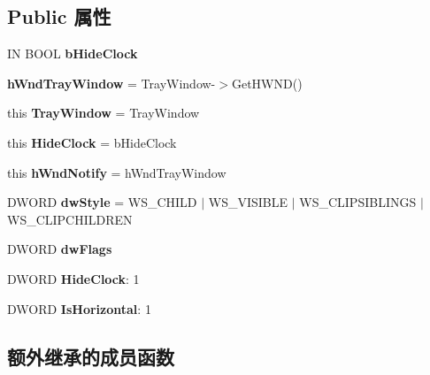 \subsection*{Public 属性}
\begin{DoxyCompactItemize}
\item 
IN B\+O\+OL {\bfseries b\+Hide\+Clock}
\item 
\mbox{\label{class_c_tray_notify_wnd_ac8056d1c145e8b71c3adc0f40e48aa59}} 
{\bfseries h\+Wnd\+Tray\+Window} = Tray\+Window-\/$>$Get\+H\+W\+ND()
\item 
\mbox{\label{class_c_tray_notify_wnd_ae325c9de4563bf180365768639f06223}} 
this {\bfseries Tray\+Window} = Tray\+Window
\item 
\mbox{\label{class_c_tray_notify_wnd_a49c2877dcc4a490e6e7c34b9729a928d}} 
this {\bfseries Hide\+Clock} = b\+Hide\+Clock
\item 
\mbox{\label{class_c_tray_notify_wnd_a754a0c23249526b825e614d6de08f176}} 
this {\bfseries h\+Wnd\+Notify} = h\+Wnd\+Tray\+Window
\item 
\mbox{\label{class_c_tray_notify_wnd_a4e863bb3d61522fdf5c8e6b472290bd9}} 
D\+W\+O\+RD {\bfseries dw\+Style} = W\+S\+\_\+\+C\+H\+I\+LD $\vert$ W\+S\+\_\+\+V\+I\+S\+I\+B\+LE $\vert$ W\+S\+\_\+\+C\+L\+I\+P\+S\+I\+B\+L\+I\+N\+GS $\vert$ W\+S\+\_\+\+C\+L\+I\+P\+C\+H\+I\+L\+D\+R\+EN
\item 
\mbox{\label{class_c_tray_notify_wnd_aebcd33d4eec9694f3432b4d08e06137e}} 
D\+W\+O\+RD {\bfseries dw\+Flags}
\item 
\mbox{\label{class_c_tray_notify_wnd_ad7c9536d7630e475e09934e8e826db94}} 
D\+W\+O\+RD {\bfseries Hide\+Clock}\+: 1
\item 
\mbox{\label{class_c_tray_notify_wnd_ae33871f1ccb743816e7cc2a5c63a3952}} 
D\+W\+O\+RD {\bfseries Is\+Horizontal}\+: 1
\end{DoxyCompactItemize}
\subsection*{额外继承的成员函数}


